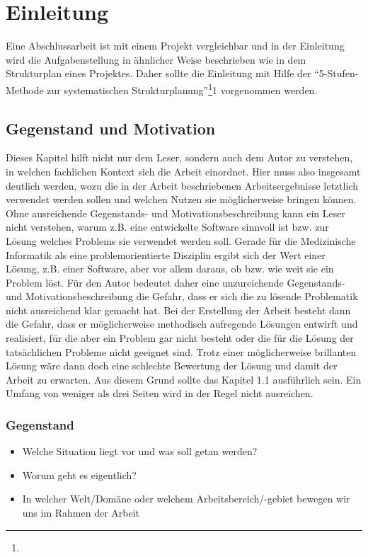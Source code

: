 \chapter{Einleitung}\label{ch:introduction}
Eine Abschlussarbeit ist mit einem Projekt vergleichbar und in der Einleitung wird die Aufgabenstellung in ähnlicher Weise beschrieben wie in dem Strukturplan eines Projektes.
Daher sollte die Einleitung mit Hilfe der \enquote{5-Stufen-Methode zur systematischen Strukturplanung}\footnote{}1 vorgenommen werden.

\section{Gegenstand und Motivation}
Dieses Kapitel hilft nicht nur dem Leser, sondern auch dem Autor zu verstehen, in welchen fachlichen Kontext sich die Arbeit einordnet. Hier muss also insgesamt deutlich werden, wozu die in der Arbeit beschriebenen Arbeitsergebnisse letztlich verwendet werden sollen und welchen Nutzen sie möglicherweise bringen können.
Ohne ausreichende Gegenstands- und Motivationsbeschreibung kann ein Leser nicht verstehen, warum z.B. eine entwickelte Software sinnvoll ist bzw. zur Lösung welches Problems sie verwendet werden soll. Gerade für die Medizinische Informatik als eine problemorientierte Disziplin ergibt sich der Wert einer Lösung, z.B. einer Software, aber vor allem daraus, ob bzw. wie weit sie ein Problem löst.
Für den Autor bedeutet daher eine unzureichende Gegenstands- und Motivationsbeschreibung die Gefahr, dass er sich die zu lösende Problematik nicht ausreichend klar gemacht hat.
Bei der Erstellung der Arbeit besteht dann die Gefahr, dass er möglicherweise methodisch aufregende Lösungen entwirft und realisiert, für die aber ein Problem gar nicht besteht oder die für die Lösung der tatsächlichen Probleme nicht geeignet sind. Trotz einer möglicherweise brillanten Lösung wäre dann doch eine schlechte Bewertung der Lösung und damit der Arbeit zu erwarten.
Aus diesem Grund sollte das Kapitel 1.1 ausführlich sein. Ein Umfang von weniger als drei Seiten wird in der Regel nicht ausreichen.

\subsection{Gegenstand}

\begin{itemize}

\item Welche Situation liegt vor und was soll getan werden?
\item Worum geht es eigentlich?
\item In welcher Welt/Domäne oder welchem Arbeitsbereich/-gebiet bewegen wir uns im Rahmen der Arbeit

\end{itemize}

